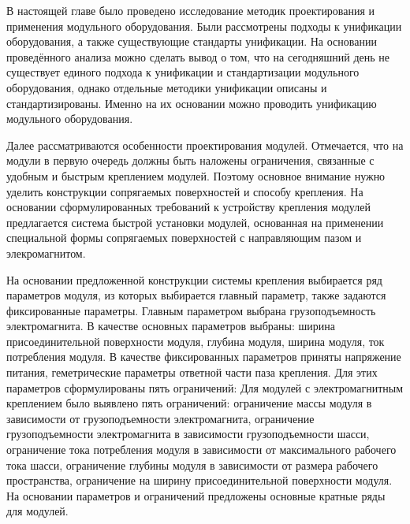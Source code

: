 В настоящей главе было проведено исследование методик проектирования и применения модульного оборудования. Были рассмотрены подходы к унификации оборудования, а также существующие стандарты унификации. На основании проведённого анализа можно сделать вывод о том, что на сегодняшний день не существует единого подхода к унификации и стандартизации модульного оборудования, однако отдельные методики унификации описаны и стандартизированы. Именно на их основании можно проводить унификацию модульного оборудования. 

Далее рассматриваются особенности проектирования модулей. Отмечается, что на модули в первую очередь должны быть наложены ограничения, связанные с удобным и быстрым креплением модулей. Поэтому основное внимание нужно уделить конструкции сопрягаемых поверхностей и способу крепления. На основании сформулированных требований к устройству крепления модулей предлагается система быстрой установки модулей, основанная на применении специальной формы сопрягаемых поверхностей с направляющим пазом и элекромагнитом.

На основании предложенной конструкции системы крепления выбирается ряд параметров модуля, из которых выбирается главный параметр, также задаются фиксированные параметры. Главным параметром выбрана грузоподъемность электромагнита. В качестве основных параметров выбраны: ширина присоединительной поверхности модуля, глубина модуля, ширина модуля, ток потребления модуля. В качестве фиксированных параметров приняты напряжение питания, геметрические параметры ответной части паза крепления. Для этих параметров сформулированы пять ограничений: Для модулей с электромагнитным креплением было выявлено пять ограничений: ограничение массы модуля в зависимости от грузоподъемности электромагнита, ограничение грузоподъемности электромагнита в зависимости грузоподъемности шасси, ограничение тока потребления модуля в зависимости от максимального рабочего тока шасси, ограничение глубины модуля в зависимости от размера рабочего пространства, ограничение на ширину присоединительной поверхности модуля. На основании параметров и ограничений предложены основные кратные ряды для модулей.

